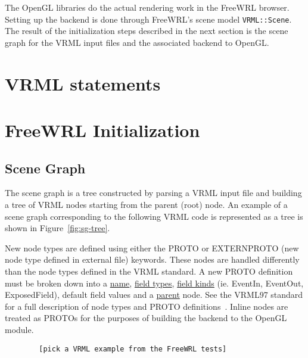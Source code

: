 \documentclass[12pt,letterpaper]{article}
\begin{document}
    The OpenGL libraries do the actual rendering work in the FreeWRL
    browser.
    Setting up the backend is done through FreeWRL's scene model
    \texttt{VRML::Scene}.
    The result of the initialization steps described in the next section
    is the scene graph for the VRML input files and the associated backend
    to OpenGL.

    \section{VRML statements}



    \section{FreeWRL Initialization}

	\subsection{Scene Graph}

	The scene graph is a tree constructed by parsing a VRML input file and
	building a tree of VRML nodes starting from the parent (root) node.
	An example of a scene graph corresponding to the following VRML code
	is represented as a tree is shown in Figure~\ref{fig:sg-tree}.

	New node types are defined using either the PROTO or EXTERNPROTO
	(new node type defined in external file) keywords.
	These nodes are handled differently than the node types defined in the
	VRML standard.
	A new PROTO definition must be broken down into a \uline{name},
	\uline{field types}, \uline{field kinds} (ie. EventIn, EventOut,
	ExposedField), default field values and a \uline{parent} node.
	See the VRML97 standard for a full description of node types and PROTO
	definitions~\cite{web3D:vrml97}.
	Inline nodes are treated as PROTOs for the purposes of building the
	backend to the OpenGL module.


	\begin{verbatim}
	    [pick a VRML example from the FreeWRL tests]
	\end{verbatim}
\end{document}
